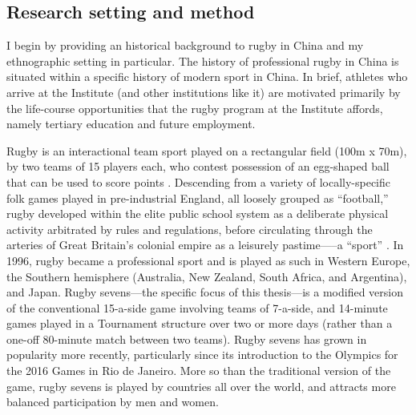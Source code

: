 \begin{CJK}{UTF8}{gbsn}




 \section{Research setting and method\label{sect:researchSettingMethod}}
 I begin by providing an historical background to rugby in China and my ethnographic setting in particular.  The history of professional rugby in China is situated within a specific history of modern sport in China.  In brief, athletes who arrive at the Institute (and other institutions like it) are motivated primarily by the life-course opportunities that the rugby program at the Institute affords, namely tertiary education and future employment.

 Rugby is an interactional team sport played on a rectangular field (100m x 70m), by two teams of 15 players each, who contest possession of an egg-shaped ball that can be used to score points \citep{IRB2014}.  Descending from a variety of locally-specific folk games played in pre-industrial England, all loosely grouped as ``football,'' rugby developed within the elite public school system as a deliberate physical activity arbitrated by rules and regulations, before circulating through the arteries of Great Britain's colonial empire as a leisurely pastime—--a ``sport'' \citep{Dunning2005}.  In 1996, rugby became a professional sport and is played as such in Western Europe, the Southern hemisphere (Australia, New Zealand, South Africa, and Argentina), and Japan. Rugby sevens---the specific focus of this thesis---is a modified version of the conventional 15-a-side game involving teams of 7-a-side, and 14-minute games played in a Tournament structure over two or more days (rather than a one-off 80-minute match between two teams).  Rugby sevens has grown in popularity more recently, particularly since its introduction to the Olympics for the 2016 Games in Rio de Janeiro.  More so than the traditional version of the game, rugby sevens is played by countries all over the world, and attracts more balanced participation by men and women.


\end{CJK}
